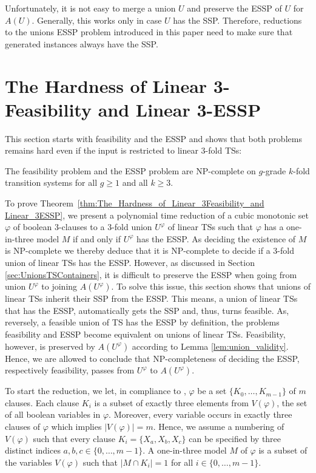 \documentclass[english]{lipics_hacked}
\begin{document}
%
Unfortunately, it is not easy to merge a union $U$ and preserve the ESSP of $U$ for $A(U)$.
Generally, this works only in case $U$ has the SSP.
Therefore, reductions to the unions ESSP problem introduced in this paper need to make sure that generated instances always have the SSP.


\section{The Hardness of Linear 3-Feasibility and Linear 3-ESSP}
\label{sec:The_Hardness_of_Linear_3Feasibility_and Linear_3ESSP}

This section starts with feasibility and the ESSP and shows that both problems remains hard even if the input is restricted to linear $3$-fold TSs:
%
\begin{theorem}
\label{thm:The_Hardness_of_Linear_3Feasibility_and Linear_3ESSP}
The feasibility problem and the ESSP problem are NP-complete on $g$-grade $k$-fold transition systems for all $g \geq 1$ and all $k \geq 3$.
\end{theorem}
%
To prove Theorem~\ref{thm:The_Hardness_of_Linear_3Feasibility_and Linear_3ESSP}, we present a polynomial time reduction of a cubic monotonic set $\varphi$ of boolean $3$-clauses to a $3$-fold union $U^\varphi$ of linear TSs such that $\varphi$ has a one-in-three model $M$ if and only if $U^\varphi$ has the ESSP.
As deciding the existence of $M$ is NP-complete \cite{MR2001} we thereby deduce that it is NP-complete to decide if a $3$-fold union of linear TSs has the ESSP.
However, as discussed in Section \ref{sec:UnionsTSContainers}, it is difficult to preserve the ESSP when going from union $U^\varphi$ to joining $A(U^\varphi)$.
To solve this issue, this section shows that unions of linear TSs inherit their SSP from the ESSP.
This means, a union of linear TSs that has the ESSP, automatically gets the SSP and, thus, turns feasible.
As, reversely, a feasible union of TS has the ESSP by definition, the problems feasibility and ESSP become equivalent on unions of linear TSs.
Feasibility, however, is preserved by $A(U^\varphi)$ according to Lemma \ref{lem:union_validity}.
Hence, we are allowed to conclude that NP-completeness of deciding the ESSP, respectively feasibility, passes from $U^\varphi$ to $A(U^\varphi)$.

To start the reduction, we let, in compliance to \cite{MR2001}, $\varphi$ be a set $\{K_0, \dots, K_{m-1}\}$ of $m$ clauses.
Each clause $K_i$ is a subset of exactly three elements from $V(\varphi)$, the set of all boolean variables in $\varphi$.
Moreover, every variable occurs in exactly three clauses of $\varphi$ which implies $|V(\varphi)| = m$.
Hence, we assume a numbering of $V(\varphi)$ such that every clause $K_i = \{X_a, X_b, X_c\}$ can be specified by three distinct indices $a, b, c \in \{0, \dots, m-1\}$.
A one-in-three model $M$ of $\varphi$ is a subset of the variables $V(\varphi)$ such that $\vert M \cap K_i \vert =1$ for all $i\in \{0, \dots, m-1\}$.
\end{document}
